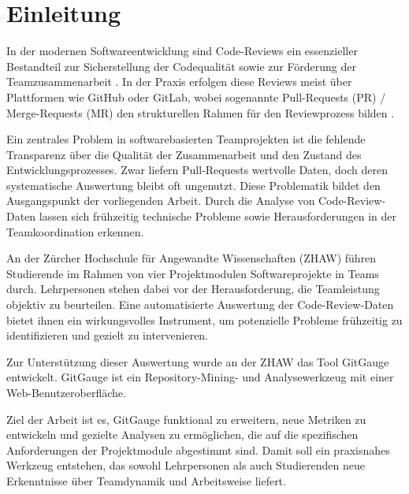 


\chapter{Einleitung} %
In der modernen Softwareentwicklung sind Code-Reviews ein essenzieller Bestandteil zur Sicherstellung der Codequalität sowie zur Förderung der Teamzusammenarbeit \parencite{dos_santos_investigating_2018}. In der Praxis erfolgen diese Reviews meist über Plattformen wie GitHub oder GitLab, wobei sogenannte Pull-Requests (PR) / Merge-Requests (MR) den \linebreak strukturellen Rahmen für den Reviewprozess bilden \parencite{noauthor_team_nodate}.

Ein zentrales Problem in softwarebasierten Teamprojekten ist die fehlende Transparenz über die Qualität der Zusammenarbeit und den Zustand des Entwicklungsprozesses. Zwar liefern Pull-Requests wertvolle Daten, doch deren systematische Auswertung bleibt oft ungenutzt. Diese Problematik bildet den Ausgangspunkt der vorliegenden Arbeit. Durch die Analyse von Code-Review-Daten lassen sich frühzeitig technische Probleme sowie Herausforderungen in der Teamkoordination erkennen.

An der Zürcher Hochschule für Angewandte Wissenschaften (ZHAW) führen Studierende im Rahmen von vier Projektmodulen Softwareprojekte in Teams durch. Lehrpersonen stehen dabei vor der Herausforderung, die Teamleistung objektiv zu beurteilen. Eine automatisierte Auswertung der Code-Review-Daten bietet ihnen ein wirkungsvolles Instrument, um potenzielle Probleme frühzeitig zu identifizieren und gezielt zu intervenieren.

Zur Unterstützung dieser Auswertung wurde an der ZHAW das Tool GitGauge entwickelt. GitGauge ist ein Repository-Mining- und Analysewerkzeug mit einer Web-Benutzeroberfläche.

Ziel der Arbeit ist es, GitGauge funktional zu erweitern, neue Metriken zu entwickeln und gezielte Analysen zu ermöglichen, die auf die spezifischen Anforderungen der Projektmodule abgestimmt sind. Damit soll ein praxisnahes Werkzeug entstehen, das sowohl Lehrpersonen als auch Studierenden neue Erkenntnisse über Teamdynamik und Arbeitsweise liefert.


